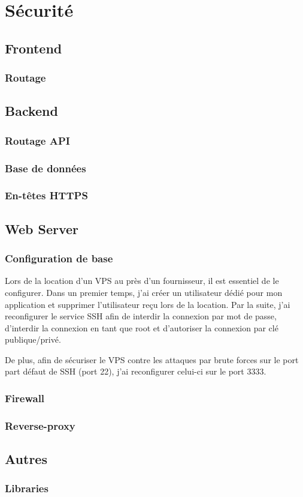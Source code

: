 \section{Sécurité}
\subsection{Frontend}
\subsubsection{Routage}
\subsection{Backend}
\subsubsection{Routage API}
\subsubsection{Base de données}
\subsubsection{En-têtes HTTPS}

\subsection{Web Server}
\subsubsection{Configuration de base}
Lors de la location d'un VPS au près d'un fournisseur, il est essentiel de le configurer. Dans un premier temps, j'ai créer un utilisateur dédié pour mon application et supprimer l'utilisateur reçu lors de la location.
Par la suite, j'ai reconfigurer le service SSH afin de interdir la connexion par mot de passe, d'interdir la connexion en tant que root et d'autoriser la connexion par clé publique/privé.

De plus, afin de sécuriser le VPS contre les attaques par brute forces sur le port part défaut de SSH (port 22), j'ai reconfigurer celui-ci sur le port 3333.


\subsubsection{Firewall}
\subsubsection{Reverse-proxy}

\subsection{Autres}
\subsubsection{Libraries}

